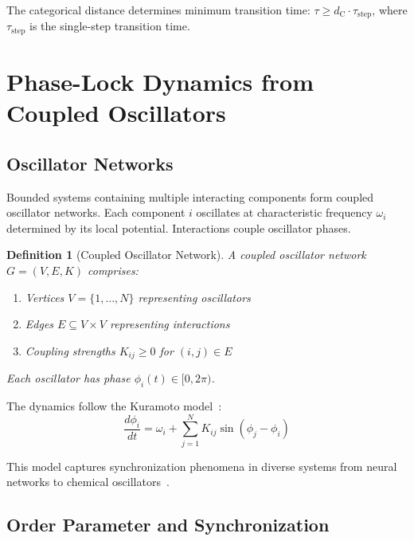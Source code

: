 \documentclass[twocolumn,aps,prb,superscriptaddress,longbibliography,floatfix]{revtex4-2}
\newtheorem{definition}[theorem]{Definition}
\theoremstyle{remark}
\newcommand{\dC}{d_\text{C}}
\begin{document}
The categorical distance determines minimum transition time:
$\tau \geq \dC \cdot \tau_\text{step}$, where $\tau_\text{step}$ is the
single-step transition time.

\section{Phase-Lock Dynamics from Coupled Oscillators}
\label{sec:phaselock}

\subsection{Oscillator Networks}

Bounded systems containing multiple interacting components form coupled
oscillator networks. Each component $i$ oscillates at characteristic
frequency $\omega_i$ determined by its local potential. Interactions
couple oscillator phases.

\begin{definition}[Coupled Oscillator Network]
\label{def:oscillator}
A coupled oscillator network $G = (V, E, K)$ comprises:
\begin{enumerate}
    \item Vertices $V = \{1, \ldots, N\}$ representing oscillators
    \item Edges $E \subseteq V \times V$ representing interactions
    \item Coupling strengths $K_{ij} \geq 0$ for $(i,j) \in E$
\end{enumerate}
Each oscillator has phase $\phi_i(t) \in [0, 2\pi)$.
\end{definition}

The dynamics follow the Kuramoto model~\cite{Kuramoto1984}:
\begin{equation}
\frac{d\phi_i}{dt} = \omega_i + \sum_{j=1}^{N} K_{ij} \sin(\phi_j - \phi_i)
\label{eq:kuramoto}
\end{equation}

This model captures synchronization phenomena in diverse systems from
neural networks to chemical oscillators~\cite{Strogatz2000,Acebron2005}.

\subsection{Order Parameter and Synchronization}
\end{document}
